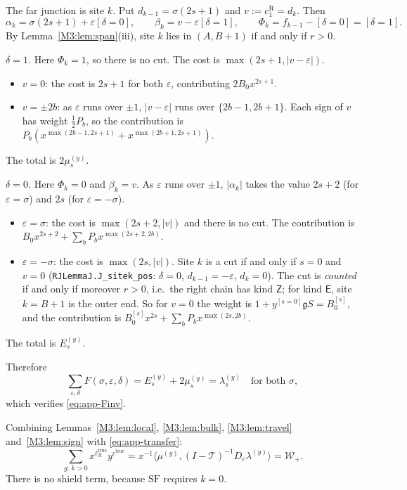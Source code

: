 \documentclass[11pt]{article}
\theoremstyle{plain}
\theoremstyle{definition}
\theoremstyle{remark}
\begin{document}
The far junction is site $k$. Put $d_{k-1}=\sigma(2s+1)$ and $v:=c^{\mathrm R}_1=d_k$. Then
\[
  \alpha_k=\sigma(2s+1)+\varepsilon[\delta=0],\qquad \beta_k=v-\varepsilon[\delta=1],\qquad
  \Phi_k=f_{k-1}-[\delta=0]=[\delta=1].
\]
By Lemma~\ref{M3:lem:span}(iii), site $k$ lies in $(A,B+1)$ if and only if $r>0$.

\emph{$\delta=1$.} Here $\Phi_k=1$, so there is no cut. The cost is
$\max(2s+1,|v-\varepsilon|)$.
\begin{itemize}
\item $v=0$: the cost is $2s+1$ for both $\varepsilon$, contributing $2B_0x^{2s+1}$.
\item $v=\pm2b$: as $\varepsilon$ runs over $\pm1$, $|v-\varepsilon|$ runs over
  $\{2b-1,2b+1\}$. Each sign of $v$ has weight $\tfrac12P_b$, so the contribution is
  $P_b(x^{\max(2b-1,2s+1)}+x^{\max(2b+1,2s+1)})$.
\end{itemize}
The total is $2\mu^{(y)}_s$.

\emph{$\delta=0$.} Here $\Phi_k=0$ and $\beta_k=v$. As $\varepsilon$ runs over $\pm1$,
$|\alpha_k|$ takes the value $2s+2$ (for $\varepsilon=\sigma$) and $2s$ (for
$\varepsilon=-\sigma$).
\begin{itemize}
\item $\varepsilon=\sigma$: the cost is $\max(2s+2,|v|)$ and there is no cut. The
  contribution is $B_0x^{2s+2}+\sum_bP_bx^{\max(2s+2,2b)}$.
\item $\varepsilon=-\sigma$: the cost is $\max(2s,|v|)$. Site $k$ is a cut if and only if
  $s=0$ and $v=0$ (\texttt{RJLemmaJ.J\_sitek\_pos}: $\delta=0$, $d_{k-1}=-\varepsilon$,
  $d_k=0$). The cut is \emph{counted} if and only if moreover $r>0$, i.e.\ the right chain
  has kind $\mathsf Z$; for kind $\mathsf E$, site $k=B+1$ is the outer end. So for $v=0$
  the weight is $1+y^{[s=0]}\mathfrak gS=B_0^{[s]}$, and the contribution is
  $B_0^{[s]}x^{2s}+\sum_bP_bx^{\max(2s,2b)}$.
\end{itemize}
The total is $E^{(y)}_s$.

Therefore
\begin{equation}\label{eq:app-k+far}
  \sum_{\varepsilon,\delta}F(\sigma,\varepsilon,\delta)=E^{(y)}_s+2\mu^{(y)}_s=\lambda^{(y)}_s
  \quad\text{for both }\sigma,
\end{equation}
which verifies \eqref{eq:app-Finv}.

Combining Lemmas~\ref{M3:lem:local}, \ref{M3:lem:bulk}, \ref{M3:lem:travel} and~\ref{M3:lem:sign}
with \eqref{eq:app-transfer}:
\[
  \sum_{g:\,k>0}x^{\ell_R^{\mathrm{true}}}y^{c^{\mathrm{true}}}
  =x^{-1}\bigl\langle\mu^{(y)},(I-\mathcal T)^{-1}D_e\lambda^{(y)}\bigr\rangle=\mathcal W_+ .
\]
There is no shield term, because $\mathrm{SF}$ requires $k=0$.
\end{document}
